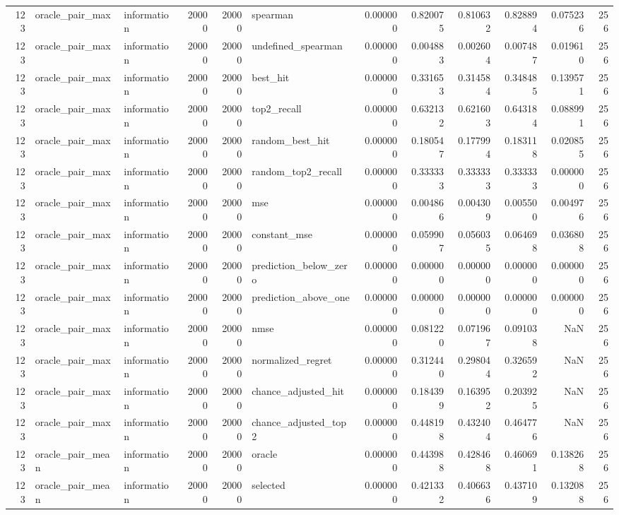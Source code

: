 \begin{tabular}{rllrrlrrrrrr}
123 & oracle_pair_max & information & 20000 & 20000 & spearman & 0.000000 & 0.820075 & 0.810632 & 0.828894 & 0.075236 & 256 \\
123 & oracle_pair_max & information & 20000 & 20000 & undefined_spearman & 0.000000 & 0.004883 & 0.002604 & 0.007487 & 0.019610 & 256 \\
123 & oracle_pair_max & information & 20000 & 20000 & best_hit & 0.000000 & 0.331653 & 0.314584 & 0.348485 & 0.139571 & 256 \\
123 & oracle_pair_max & information & 20000 & 20000 & top2_recall & 0.000000 & 0.632132 & 0.621603 & 0.643184 & 0.088991 & 256 \\
123 & oracle_pair_max & information & 20000 & 20000 & random_best_hit & 0.000000 & 0.180547 & 0.177994 & 0.183118 & 0.020855 & 256 \\
123 & oracle_pair_max & information & 20000 & 20000 & random_top2_recall & 0.000000 & 0.333333 & 0.333333 & 0.333333 & 0.000000 & 256 \\
123 & oracle_pair_max & information & 20000 & 20000 & mse & 0.000000 & 0.004866 & 0.004309 & 0.005500 & 0.004976 & 256 \\
123 & oracle_pair_max & information & 20000 & 20000 & constant_mse & 0.000000 & 0.059907 & 0.056035 & 0.064698 & 0.036808 & 256 \\
123 & oracle_pair_max & information & 20000 & 20000 & prediction_below_zero & 0.000000 & 0.000000 & 0.000000 & 0.000000 & 0.000000 & 256 \\
123 & oracle_pair_max & information & 20000 & 20000 & prediction_above_one & 0.000000 & 0.000000 & 0.000000 & 0.000000 & 0.000000 & 256 \\
123 & oracle_pair_max & information & 20000 & 20000 & nmse & 0.000000 & 0.081220 & 0.071967 & 0.091038 & NaN & 256 \\
123 & oracle_pair_max & information & 20000 & 20000 & normalized_regret & 0.000000 & 0.312440 & 0.298044 & 0.326592 & NaN & 256 \\
123 & oracle_pair_max & information & 20000 & 20000 & chance_adjusted_hit & 0.000000 & 0.184399 & 0.163952 & 0.203925 & NaN & 256 \\
123 & oracle_pair_max & information & 20000 & 20000 & chance_adjusted_top2 & 0.000000 & 0.448198 & 0.432404 & 0.464776 & NaN & 256 \\
123 & oracle_pair_mean & information & 20000 & 20000 & oracle & 0.000000 & 0.443988 & 0.428468 & 0.460691 & 0.138268 & 256 \\
123 & oracle_pair_mean & information & 20000 & 20000 & selected & 0.000000 & 0.421332 & 0.406636 & 0.437109 & 0.132088 & 256 \\

\end{tabular}
